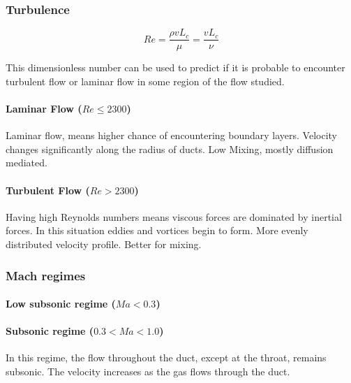 \newpage

\subsubsection{Turbulence}

	$$
	Re = \frac{\rho v L_c}{\mu} = \frac{v L_c}{\nu}
	$$

	This dimensionless number can be used to predict if it is probable to encounter turbulent flow or laminar flow in some region of the flow studied.
				
\paragraph{Laminar Flow (\(Re \le 2300\))}

	Laminar flow, means higher chance of encountering boundary layers.
	Velocity changes significantly along the radius of ducts.
	Low Mixing, mostly diffusion mediated.


\paragraph{Turbulent Flow (\(Re > 2300\))}

	Having high Reynolds numbers means viscous forces are dominated by inertial forces.
	In this situation eddies and vortices begin to form.
	More evenly distributed velocity profile. Better for mixing. 

\newpage

\subsubsection{Mach regimes}
\paragraph{Low subsonic regime (\(Ma < 0.3\))}

\paragraph{Subsonic regime (\(0.3 < Ma < 1.0\))} 

	In this regime, the flow throughout the duct, except at the throat, remains subsonic.
	The velocity increases as the gas flows through the duct.\\

